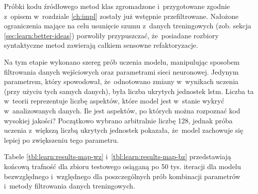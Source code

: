 \documentclass[twoside]{praca}
\begin{document}


Próbki kodu źródłowego metod klas zgromadzone i~przygotowane zgodnie z~opisem w~rozdziale \ref{ch:impl} zostały już wstępnie przefiltrowane. Nałożone ograniczenia mające na celu usunięcie szumu z~danych treningowych (zob. sekcja \ref{sec:learn:better-ideas}) pozwoliły przypuszczać, że~posiadane rozbiory syntaktyczne metod zawierają całkiem sensowne refaktoryzacje.

Na tym etapie wykonano szereg prób uczenia modelu, manipulując sposobem filtrowania danych wejściowych oraz parametrami sieci neuronowej. Jedynym parametrem, który spowodował, że~odnotowano zmiany w~wynikach uczenia (przy użyciu tych samych danych), była liczba ukrytych jednostek \gls{lstm}. Liczba ta w~teorii reprezentuje liczbę aspektów, które model jest w~stanie wykryć w~analizowanych danych. Ile jest aspektów, po których można rozpoznać kod wysokiej jakości? Początkowo wybrano arbitralnie liczbę 128, jednak próba uczenia z~większą liczbą ukrytych jednostek pokazała, że~model zachowuje się lepiej po zwiększeniu tego parametru.

Tabele \ref{tbl:learn:results-map-wz} i~\ref{tbl:learn:results-map-bz} przedstawiają końcową trafność dla zbioru testowego osiąganą po 50 tys. iteracji dla modelu bezwzględnego i~względnego dla poszczególnych prób kombinacji parametrów i~metody filtrowania danych treningowych.
\end{document}
